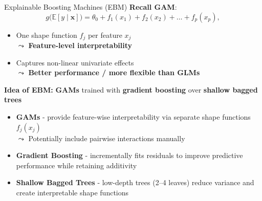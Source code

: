 \documentclass[10pt,compress,t,notes=noshow, xcolor=table]{beamer}
\begin{document}
\begin{frame}{Explainable Boosting Machines (EBM)}
\textbf{Recall GAM}: 
$$
g\big(\mathbb{E}[y \mid \mathbf{x}]\big) = \theta_0 + f_1(x_{1}) + f_2(x_{2}) + \ldots + f_p(x_{p}),
$$

\begin{itemize}
    \item One shape function $f_j$ per feature $x_j$\\ $\leadsto$ \textbf{Feature-level interpretability}
    \item Captures non-linear univariate effects\\ $\leadsto$ \textbf{Better performance / more flexible than GLMs}
\end{itemize}

\medskip

\textbf{Idea of EBM:} \textbf{GAMs} trained with \textbf{gradient boosting} over \textbf{shallow bagged trees}
\begin{itemize}
    \item \textbf{GAMs} - provide feature-wise interpretability via separate shape functions $f_j(x_j)$\\
    $\leadsto$ Potentially include pairwise interactions manually
    \item \textbf{Gradient Boosting} - incrementally fits residuals to improve predictive performance while retaining additivity
    \item \textbf{Shallow Bagged Trees} - low-depth trees (2–4 leaves) reduce variance and create interpretable shape functions
\end{itemize}



\end{frame}
\end{document}
